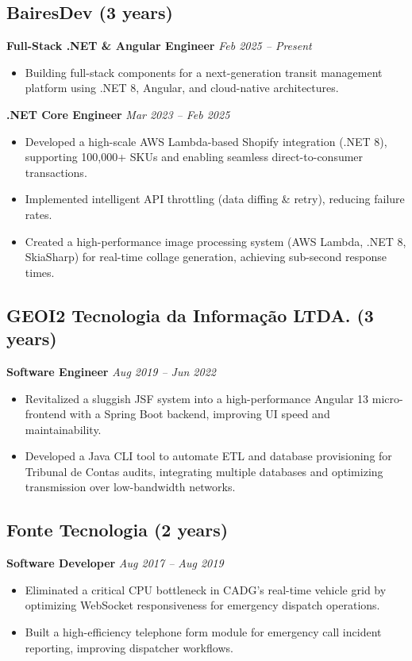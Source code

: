 \documentclass[a4paper,10pt]{article}
\begin{document}
\begin{minipage}[t]{0.65\textwidth}
    \subsection*{BairesDev (3 years)}
    \textbf{Full-Stack .NET \& Angular Engineer} \hfill \textit{Feb 2025 – Present}
    \begin{itemize}
        \item Building full-stack components for a next-generation transit management platform using .NET 8, Angular, and cloud-native architectures.
    \end{itemize}
    
    \textbf{.NET Core Engineer} \hfill \textit{Mar 2023 – Feb 2025}
    \begin{itemize}
        \item Developed a high-scale AWS Lambda-based Shopify integration (.NET 8), supporting 100,000+ SKUs and enabling seamless direct-to-consumer transactions.
        \item Implemented intelligent API throttling (data diffing \& retry), reducing failure rates.
        \item Created a high-performance image processing system (AWS Lambda, .NET 8, SkiaSharp) for real-time collage generation, achieving sub-second response times.
    \end{itemize}
    
    \subsection*{GEOI2 Tecnologia da Informação LTDA. (3 years)}
    \textbf{Software Engineer} \hfill \textit{Aug 2019 – Jun 2022}
    \begin{itemize}
        \item Revitalized a sluggish JSF system into a high-performance Angular 13 micro-frontend with a Spring Boot backend, improving UI speed and maintainability.
        \item Developed a Java CLI tool to automate ETL and database provisioning for Tribunal de Contas audits, integrating multiple databases and optimizing transmission over low-bandwidth networks.
    \end{itemize}
    
    \subsection*{Fonte Tecnologia (2 years)}
    \textbf{Software Developer} \hfill \textit{Aug 2017 – Aug 2019}
    \begin{itemize}
        \item Eliminated a critical CPU bottleneck in CADG’s real-time vehicle grid by optimizing WebSocket responsiveness for emergency dispatch operations.
        \item Built a high-efficiency telephone form module for emergency call incident reporting, improving dispatcher workflows.
    \end{itemize}
\end{minipage}
\end{document}
